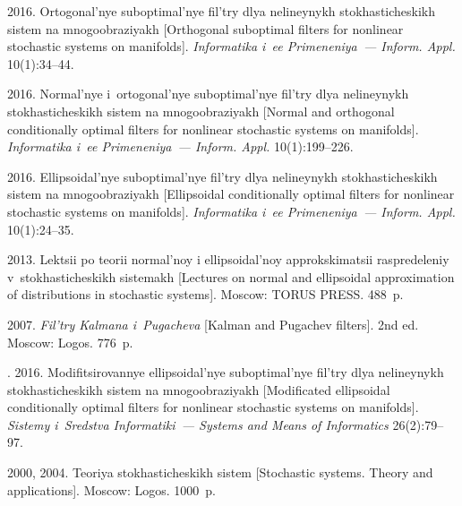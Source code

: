   \begin{multicols}{2}

\renewcommand{\bibname}{\protect\rmfamily References}

{\small\frenchspacing
 {%
 \begin{thebibliography}{99}
 2016.
Ortogonal'nye suboptimal'nye fil'try dlya nelineynykh stokhasticheskikh sistem 
na mno\-go\-ob\-ra\-zi\-yakh [Orthogonal suboptimal filters for nonlinear stochastic 
systems on manifolds]. \textit{Informatika i~ee Primeneniya~---
Inform. Appl.} 10(1):34--44.

 2016.
Normal'nye i~ortogonal'nye suboptimal'nye fil'try dlya nelineynykh stokhasticheskikh 
sistem na mnogoobraziyakh  [Normal and orthogonal conditionally optimal filters 
for nonlinear stochastic systems on manifolds].
\textit{Informatika i~ee Primeneniya~---
Inform. Appl.} 10(1):199--226.

 2016.
Ellipsoidal'nye suboptimal'nye fil'try dlya nelineynykh stokhasticheskikh 
sistem na mnogoobraziyakh [Ellipsoidal conditionally optimal filters for nonlinear 
stochastic systems on manifolds].
\textit{Informatika i~ee Primeneniya~---
Inform. Appl.} 10(1):24--35.


 2013. 
Lektsii po teorii normal'noy i ellipsoidal'noy 
approkskimatsii raspredeleniy v~stokhasticheskikh sistemakh [Lectures on normal 
and ellipsoidal approximation of distributions in stochastic
systems].  Moscow: TORUS PRESS. 
488~p.

 2007.
\textit{Fil'try Kalmana i~Pugacheva} [Kalman and Pugachev filters]. 
2nd ed. Moscow: Logos. 776~p.

. 2016.
Modifitsirovannye ellipsoidal'nye suboptimal'nye fil'try dlya 
nelineynykh stokhasticheskikh sistem na mno\-go\-ob\-ra\-zi\-yakh [Modificated ellipsoidal 
conditionally optimal filters for nonlinear stochastic systems on manifolds].
\textit{Sistemy i~Sredstva Informatiki~--- Systems and Means of Informatics}
26(2):79--97.


 2000, 2004.
Teoriya stokhasticheskikh sistem [Stochastic systems. Theory and  applications]. 
Moscow: Logos. 1000~p.  %


\end{thebibliography}}}
\end{multicols}
